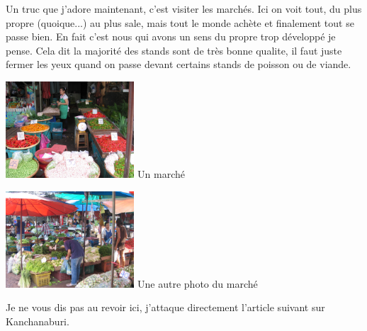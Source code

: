 \begin{multicols}{2}
Un truc que j'adore maintenant, c'est visiter les marchés. Ici on voit tout, du plus propre (quoique...) au plus sale, mais tout le monde achète et finalement tout se passe bien. En fait c'est nous qui avons un sens du propre trop développé je pense. Cela dit la majorité des stands sont de très bonne qualite, il faut juste fermer les yeux quand on passe devant certains stands de poisson ou de viande.

\hspace*{-0.65cm}
\includegraphics[width=4.8cm]{articles/Bangkok/1384.jpg}
Un marché

\hspace*{-0.65cm}
\includegraphics[width=4.8cm]{articles/Bangkok/1387.jpg}
Une autre photo du marché


Je ne vous dis pas au revoir ici, j'attaque directement l'article suivant sur Kanchanaburi.

\end{multicols}


